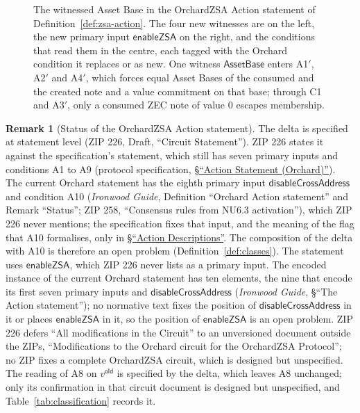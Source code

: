 \documentclass[11pt,a4paper]{article}
\theoremstyle{definition}
\newtheorem{remark}[theorem]{Remark}
\begin{document}
\begin{figure}[ht]
\caption{The witnessed Asset Base in the OrchardZSA Action statement of
Definition~\ref{def:zsa-action}. The four new witnesses are on the left,
the new primary input $\mathsf{enableZSA}$ on the right, and the conditions
that read them in the centre, each tagged with the Orchard condition it
replaces or as new. One witness $\mathsf{AssetBase}$ enters A1$'$, A2$'$
and A4$'$, which forces equal Asset Bases of the consumed and the created
note and a value commitment on that base; through C1 and A3$'$, only a
consumed ZEC note of value $0$ escapes membership.}
\label{fig:action-zsa}
\end{figure}

\begin{remark}[Status of the OrchardZSA Action statement]
\label{rem:zsa-action-status}
The delta is specified at statement level (ZIP 226, Draft, ``Circuit
Statement''). ZIP 226 states it against the specification's statement,
which still has seven primary inputs and conditions A1 to A9 (protocol
specification,
\href{https://zips.z.cash/protocol/protocol.pdf\#actionstatement}{\S``Action
Statement (Orchard)''}). The current Orchard statement has the eighth
primary input $\mathsf{disableCrossAddress}$ and condition A10
(\emph{Ironwood Guide}, Definition ``Orchard Action statement'' and Remark
``Status''; ZIP 258, ``Consensus rules from NU6.3 activation''), which ZIP
226 never mentions; the specification fixes that input, and the meaning of
the flag that A10 formalises, only in
\href{https://zips.z.cash/protocol/protocol.pdf\#actiondesc}{\S``Action
Descriptions''}. The composition of the delta with A10 is therefore
an open problem (Definition~\ref{def:classes}). The statement uses
$\mathsf{enableZSA}$, which ZIP 226 never lists as a primary input. The
encoded instance of the current Orchard statement has ten elements, the
nine that encode its first seven primary inputs and
$\mathsf{disableCrossAddress}$ (\emph{Ironwood Guide}, \S``The Action
statement''); no normative text fixes the position of
$\mathsf{disableCrossAddress}$ in it or places $\mathsf{enableZSA}$ in it,
so the position of $\mathsf{enableZSA}$ is an open problem. ZIP 226 defers ``All
modifications in the Circuit'' to an unversioned document outside the ZIPs,
``Modifications to the Orchard circuit for the OrchardZSA Protocol''; no ZIP
fixes a complete OrchardZSA circuit, which is designed but unspecified. The
reading of A8 on $v^{\mathsf{old}}$ is specified by the delta, which leaves
A8 unchanged; only its confirmation in that circuit document is designed
but unspecified, and Table~\ref{tab:classification} records it.
\end{remark}
\end{document}
